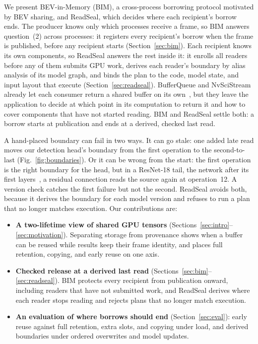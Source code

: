 \documentclass[conference]{IEEEtran}
\begin{document}
We present BEV-in-Memory (BIM), a cross-process borrowing protocol motivated by BEV sharing, and ReadSeal, which decides where each recipient's borrow ends. The producer knows only which processes receive a frame, so BIM answers question~(2) across processes: it registers every recipient's borrow when the frame is published, before any recipient starts (Section~\ref{sec:bim}). Each recipient knows its own components, so ReadSeal answers the rest inside it: it enrolls all readers before any of them submits GPU work, derives each reader's boundary by alias analysis of its model graph, and binds the plan to the code, model state, and input layout that execute (Section~\ref{sec:readseal}). BufferQueue and NvSciStream already let each consumer return a shared buffer on its own~\cite{bufferqueue,nvscistream}, but they leave the application to decide at which point in its computation to return it and how to cover components that have not started reading. BIM and ReadSeal settle both: a borrow starts at publication and ends at a derived, checked last read.

A hand-placed boundary can fail in two ways. It can go stale: one added late read moves our detection head's boundary from the first operation to the second-to-last (Fig.~\ref{fig:boundaries}). Or it can be wrong from the start: the first operation is the right boundary for the head, but in a ResNet-18 tail, the network after its first layers~\cite{resnet}, a residual connection reads the source again at operation~12. A version check catches the first failure but not the second. ReadSeal avoids both, because it derives the boundary for each model version and refuses to run a plan that no longer matches execution. Our contributions are:
\begin{itemize}
\item \textbf{A two-lifetime view of shared GPU tensors} (Sections~\ref{sec:intro}--\ref{sec:motivation}). Separating storage from provenance shows when a buffer can be reused while results keep their frame identity, and places full retention, copying, and early reuse on one axis.
\item \textbf{Checked release at a derived last read} (Sections~\ref{sec:bim}--\ref{sec:readseal}). BIM protects every recipient from publication onward, including readers that have not submitted work, and ReadSeal derives where each reader stops reading and rejects plans that no longer match execution.
\item \textbf{An evaluation of where borrows should end} (Section~\ref{sec:eval}): early reuse against full retention, extra slots, and copying under load, and derived boundaries under ordered overwrites and model updates.
\end{itemize}
\end{document}

